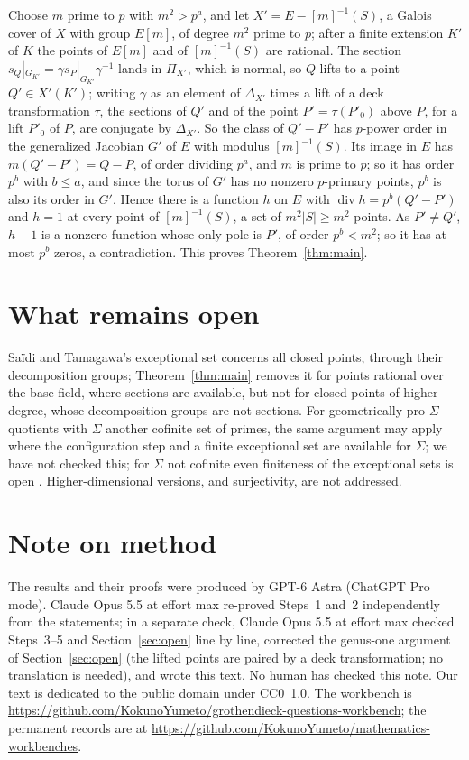 \documentclass[11pt]{amsart}
\newcommand{\workbenchurl}{https://github.com/KokunoYumeto/grothendieck-questions-workbench}
\newcommand{\recordurl}{https://github.com/KokunoYumeto/mathematics-workbenches}
\theoremstyle{remark}
\DeclareMathOperator{\divi}{div}
\begin{document}
Choose $m$ prime to $p$ with $m^2>p^a$, and let $X'=E-[m]^{-1}(S)$, a Galois cover of $X$ with group $E[m]$, of degree $m^2$ prime to $p$; after a finite extension $K'$ of $K$ the points of $E[m]$ and of $[m]^{-1}(S)$ are rational. The section $s_Q|_{G_{K'}}=\gamma s_P|_{G_{K'}}\gamma^{-1}$ lands in $\Pi_{X'}$, which is normal, so $Q$ lifts to a point $Q'\in X'(K')$; writing $\gamma$ as an element of $\Delta_{X'}$ times a lift of a deck transformation $\tau$, the sections of $Q'$ and of the point $P'=\tau(P'_0)$ above $P$, for a lift $P'_0$ of $P$, are conjugate by $\Delta_{X'}$. So the class of $Q'-P'$ has $p$-power order in the generalized Jacobian $G'$ of $E$ with modulus $[m]^{-1}(S)$. Its image in $E$ has $m(Q'-P')=Q-P$, of order dividing $p^a$, and $m$ is prime to $p$; so it has order $p^b$ with $b\le a$, and since the torus of $G'$ has no nonzero $p$-primary points, $p^b$ is also its order in $G'$. Hence there is a function $h$ on $E$ with $\divi h=p^b(Q'-P')$ and $h=1$ at every point of $[m]^{-1}(S)$, a set of $m^2|S|\ge m^2$ points. As $P'\ne Q'$, $h-1$ is a nonzero function whose only pole is $P'$, of order $p^b<m^2$; so it has at most $p^b$ zeros, a contradiction. This proves Theorem~\ref{thm:main}.

\section{What remains open}
Sa\"idi and Tamagawa's exceptional set concerns all closed points, through their decomposition groups; Theorem~\ref{thm:main} removes it for points rational over the base field, where sections are available, but not for closed points of higher degree, whose decomposition groups are not sections. For geometrically pro-$\Sigma$ quotients with $\Sigma$ another cofinite set of primes, the same argument may apply where the configuration step and a finite exceptional set are available for $\Sigma$; we have not checked this; for $\Sigma$ not cofinite even finiteness of the exceptional sets is open \cite[pp.~4--5]{ST18}. Higher-dimensional versions, and surjectivity, are not addressed.

\section*{Note on method}
The results and their proofs were produced by GPT-6 Astra (ChatGPT Pro mode). Claude Opus 5.5 at effort max re-proved Steps~1 and~2 independently from the statements; in a separate check, Claude Opus 5.5 at effort max checked Steps~3--5 and Section~\ref{sec:open} line by line, corrected the genus-one argument of Section~\ref{sec:open} (the lifted points are paired by a deck transformation; no translation is needed), and wrote this text. No human has checked this note. Our text is dedicated to the public domain under CC0~1.0. The workbench is \expandafter\url\expandafter{\workbenchurl}; the permanent records are at \expandafter\url\expandafter{\recordurl}.
\end{document}
